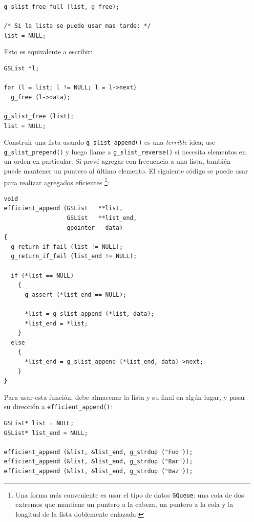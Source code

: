 \begin{lstlisting}[style=GLib/GTK]
g_slist_free_full (list, g_free);

/* Si la lista se puede usar mas tarde: */
list = NULL;
\end{lstlisting}

Esto es equivalente a escribir:

\begin{lstlisting}[style=GLib/GTK]
GSList *l;

for (l = list; l != NULL; l = l->next)
  g_free (l->data);

g_slist_free (list);
list = NULL;
\end{lstlisting}

Construir una lista usando \lstinline{g_slist_append()} es una \emph{terrible} idea; use \lstinline{g_slist_prepend()} y luego llame a \lstinline{g_slist_reverse()} si necesita elementos en un orden en particular. Si prevé agregar con frecuencia a una lista, también puede mantener un puntero al último elemento. El siguiente código se puede usar para realizar agregados eficientes \footnote{Una forma más conveniente es usar el tipo de datos \lstinline{GQueue}: una cola de dos extremos que mantiene un puntero a la cabeza, un puntero a la cola y la longitud de la lista doblemente enlazada.}:

\pagebreak[2]

\begin{lstlisting}[style=GLib/GTK]
void
efficient_append (GSList   **list,
                  GSList   **list_end,
                  gpointer   data)
{
  g_return_if_fail (list != NULL);
  g_return_if_fail (list_end != NULL);

  if (*list == NULL)
    {
      g_assert (*list_end == NULL);

      *list = g_slist_append (*list, data);
      *list_end = *list;
    }
  else
    {
      *list_end = g_slist_append (*list_end, data)->next;
    }
}
\end{lstlisting}

Para usar esta función, debe almacenar la lista y su final en algún lugar, y pasar su dirección a \lstinline{efficient_append()}:

\begin{lstlisting}[style=GLib/GTK]
GSList* list = NULL;
GSList* list_end = NULL;

efficient_append (&list, &list_end, g_strdup ("Foo"));
efficient_append (&list, &list_end, g_strdup ("Bar"));
efficient_append (&list, &list_end, g_strdup ("Baz"));
\end{lstlisting}

